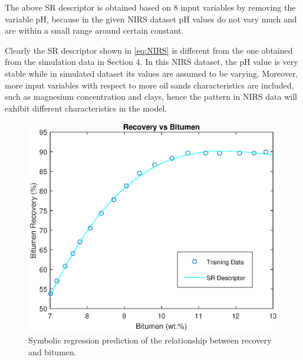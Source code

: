 \documentclass[final,5p,times,twocolumn]{elsarticle}
\begin{document}
The above SR descriptor is obtained based on 8 input variables by removing the variable pH, because in the given NIRS dataset pH values do not vary much and are within a small range around certain constant.

Clearly the SR descriptor shown in \autoref{eq:NIRS} is different from the one obtained from the simulation data in Section 4. In this NIRS dataset, the pH value is very stable while in simulated dataset its values are assumed to be varying. Moreover, more input variables with respect to more oil sands characteristics are included, such as magnesium concentration and clays, hence the pattern in NIRS data will exhibit different characteristics in the model. 




\begin{figure}[!hptb]
	\centering
	\includegraphics[width=\linewidth,clip]{NIRS_BITUMEN.eps}
	\caption{Symbolic regression prediction of the relationship between recovery and bitumen.}
	\label{fig:NIRS_BITUMEN}
\end{figure}
\end{document}
